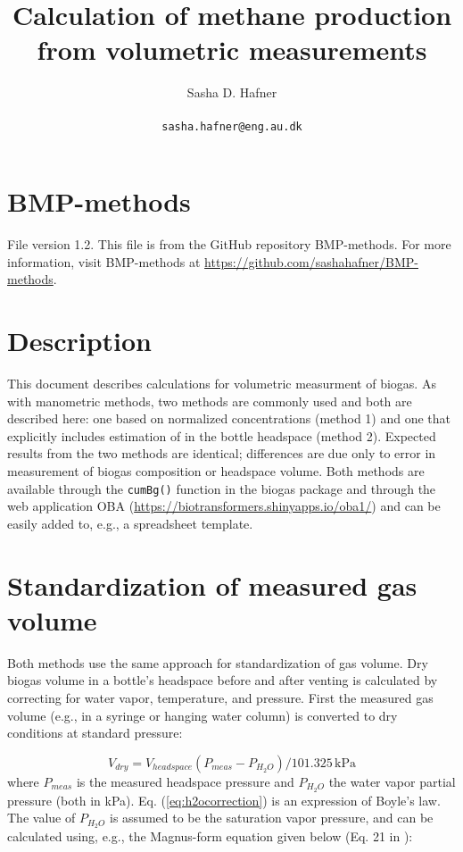 \documentclass[]{article}
\title {Calculation of methane production from volumetric measurements}
\author{Sasha D. Hafner\\
\\
\texttt{sasha.hafner@eng.au.dk}
}
\newcommand{\unit}[1]{\ensuremath{\, \mathrm{#1}}}
\begin{document}
\maketitle

\section{BMP-methods}
File version 1.2. 
This file is from the GitHub repository BMP-methods.
For more information, visit BMP-methods at \url{https://github.com/sashahafner/BMP-methods}.

\section{Description}
This document describes calculations for volumetric measurment of biogas.
As with manometric methods, two methods are commonly used and both are described here: one based on normalized  concentrations (method 1) and one that explicitly includes estimation of  in the bottle headspace (method 2).
Expected results from the two methods are identical; differences are due only to error in measurement of biogas composition or headspace volume.
Both methods are available through the \texttt{cumBg()} function in the biogas package \cite{softwarex} and through the web application OBA (\url{https://biotransformers.shinyapps.io/oba1/}) and can be easily added to, e.g., a spreadsheet template.

\section{Standardization of measured gas volume}
Both methods use the same approach for standardization of gas volume.
Dry biogas volume in a bottle's headspace before and after venting is calculated by correcting for water vapor, temperature, and pressure.
First the measured gas volume (e.g., in a syringe or hanging water column) is converted to dry conditions at standard pressure:

\begin{equation}
  \label{eq:h2ocorrection}
  V_{dry} = V_{headspace}(P_{meas} - P_{H_2O})/101.325 \unit{kPa}
\end{equation}
where $P_{meas}$ is the measured headspace pressure and $P_{H_2O}$ the water vapor partial pressure (both in kPa).
Eq. (\ref{eq:h2ocorrection}) is an expression of Boyle's law.
The value of $P_{H_2O}$ is assumed to be the saturation vapor pressure, and can be calculated using, e.g., the Magnus-form equation given below (Eq. 21 in \cite{magnus}):
\end{document}
